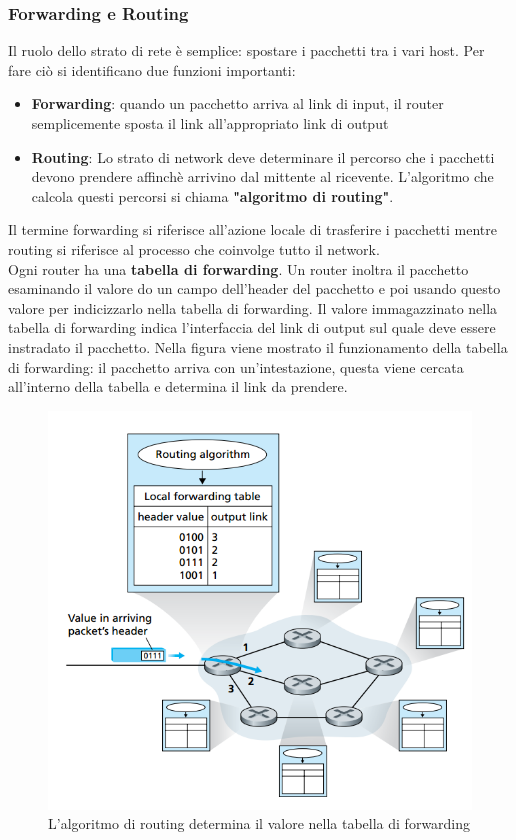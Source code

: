 \documentclass[11pt,a4paper]{article}
\begin{document}
\subsubsection{Forwarding e Routing}
Il ruolo dello strato di rete è semplice: spostare i pacchetti tra i vari host. Per fare ciò si identificano due funzioni importanti:
\begin{itemize}
	\item \textbf{Forwarding}: quando un pacchetto arriva al link di input, il router semplicemente sposta il link all'appropriato link di output
	\item \textbf{Routing}: Lo strato di network deve determinare il percorso che i pacchetti devono prendere affinchè arrivino dal mittente al ricevente. L'algoritmo che calcola questi percorsi si chiama \textbf{"algoritmo di routing"}.
\end{itemize}
Il termine forwarding si riferisce all'azione locale di trasferire i pacchetti mentre routing si riferisce al processo che coinvolge tutto il network. \\
Ogni router ha una \textbf{tabella di forwarding}. Un router inoltra il pacchetto esaminando il valore do un campo dell'header del pacchetto e poi usando questo valore per indicizzarlo nella tabella di forwarding. Il valore immagazzinato nella tabella di forwarding indica l'interfaccia del link di output sul quale deve essere instradato il pacchetto.
Nella figura viene mostrato il funzionamento della tabella di forwarding: il pacchetto arriva con un'intestazione, questa viene cercata all'interno della tabella e determina il link da prendere.
\begin{figure}
	\begin{center}
		\includegraphics[scale=0.6]{img/050.png}
		\caption{L'algoritmo di routing determina il valore nella tabella di forwarding}
	\end{center}
\end{figure}
\end{document}
